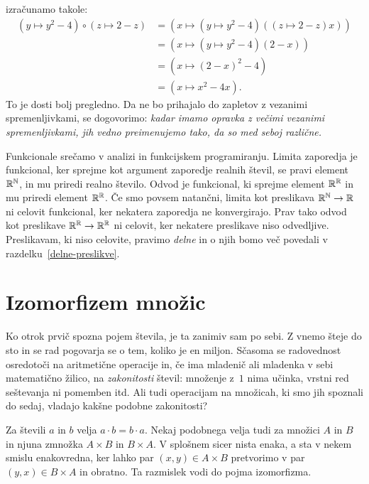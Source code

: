 %
izračunamo takole:
%
\begin{align*}
  (y \mapsto y^2  - 4) \circ (z \mapsto 2 - z)
  &= (x \mapsto (y \mapsto y^2 - 4) ((z \mapsto 2 - z) x)) \\
  &= (x \mapsto (y \mapsto y^2 - 4) (2 - x)) \\
  &= (x \mapsto (2 - x)^2 - 4) \\
  &= (x \mapsto x^2 - 4 x).
\end{align*}
%
To je dosti bolj pregledno. Da ne bo prihajalo do zapletov z vezanimi spremenljivkami, se
dogovorimo: \emph{kadar imamo opravka z večimi vezanimi spremenljivkami, jih vedno
  preimenujemo tako, da so med seboj različne.}

Funkcionale srečamo v analizi in funkcijskem programiranju. Limita zaporedja je
funkcional, ker sprejme kot argument zaporedje realnih števil, se pravi element $\mathbb{R}^{\mathbb{N}}$,
in mu priredi realno število. Odvod je funkcional, ki sprejme element $\mathbb{R}^{\mathbb{R}}$ in mu
priredi element $\mathbb{R}^{\mathbb{R}}$. Če smo povsem natančni, limita kot preslikava $\mathbb{R}^{\mathbb{N}} \to \mathbb{R}$
ni celovit funkcional, ker nekatera zaporedja ne konvergirajo. Prav tako odvod kot
preslikave $\mathbb{R}^{\mathbb{R}} \to \mathbb{R}^{\mathbb{R}}$ ni celovit, ker nekatere preslikave niso odvedljive.
Preslikavam, ki niso celovite, pravimo \emph{delne} in o njih bomo več povedali v
razdelku~\ref{delne-preslikve}.

\section{Izomorfizem množic}
\label{sec:izomorfizem-mnozic}

Ko otrok prvič spozna pojem števila, je ta zanimiv sam po sebi. Z vnemo šteje do sto in se
rad pogovarja se o tem, koliko je en miljon. Sčasoma se radovednost osredotoči na
aritmetične operacije in, če ima mladenič ali mladenka v sebi matematično žilico, na
\emph{zakonitosti} števil: množenje z~$1$ nima učinka, vrstni red seštevanja ni pomemben
itd. Ali tudi operacijam na množicah, ki smo jih spoznali do sedaj, vladajo kakšne
podobne zakonitosti?

Za števili $a$ in $b$ velja $a \cdot b = b \cdot a$. Nekaj podobnega velja tudi za množici
$A$ in $B$ in njuna zmnožka $A \times B$ in $B \times A$. V splošnem sicer nista enaka, a
sta v nekem smislu enakovredna, ker lahko par $(x, y) \in A \times B$ pretvorimo v par
$(y, x) \in B \times A$ in obratno. Ta razmislek vodi do pojma izomorfizma.


